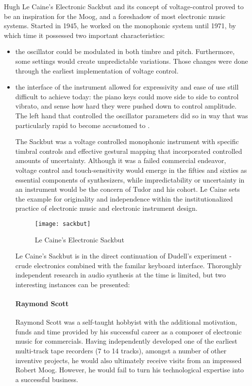 Hugh Le Caine’s Electronic Sackbut and its concept of voltage-control proved to be an inspiration for the Moog, and a foreshadow of most electronic music systems. Started in 1945, he worked on the monophonic system until 1971, by which time it possessed two important characteristics: 
\begin{itemize}
	\item the oscillator could be modulated in both timbre and pitch. Furthermore, some settings would create unpredictable variations. Those changes were done through the earliest implementation of voltage control. 
	\item the interface of the instrument allowed for expressivity and ease of use still difficult to achieve today: the piano keys could move side to side to control vibrato, and sense how hard they were pushed down to control amplitude. The left hand that controlled the oscillator parameters did so in way that was particularly rapid to become accustomed to \citep{holmes2002}. 
	
	The Sackbut was a voltage controlled monophonic instrument with specific timbral controls and effective gestural mapping that incorporated controlled amounts of uncertainty. Although it was a failed commercial endeavor, voltage control and touch-sensitivity would emerge in the fifties and sixties as essential components of synthesizers, while impredictability or uncertainty in an instrument would be the concern of Tudor and his cohort. Le Caine sets the example for originality and independence within the institutionalized practice of electronic music and electronic instrument design\cite[p.147]{holmes2002}. 

	\begin{figure}[h!]
	  \caption{Le Caine's Electronic Sackbut}
	  \centering
	    \texttt{[image: sackbut]}
	\end{figure}

Le Caine's Sackbut is in the direct continuation of Dudell's experiment - crude electronics combined with the familar keyboard interface. Thoroughly independent research in audio synthesis at the time is limited, but two interesting instances can be presented: 

\paragraph{Raymond Scott}

Raymond Scott was a self-taught hobbyist with the additional motivation, funds and time provided by his successful career as a composer of electronic music for commercials. Having independently developed one of the earliest multi-track tape recorders (7 to 14 tracks), amongst a number of other inventive projects, he would also ultimately receive visits from an impressed Robert Moog. However, he would fail to turn his technological expertise into a successful business. 


\end{itemize}
